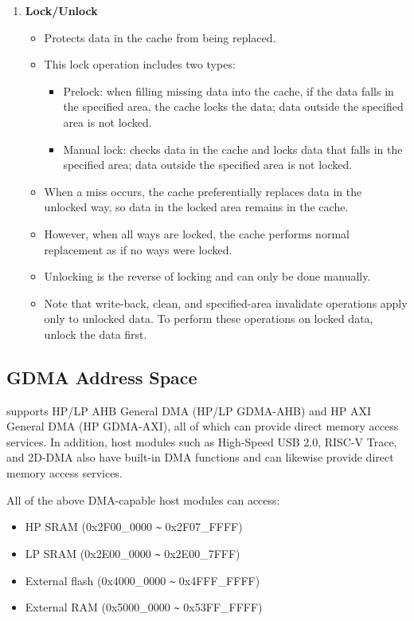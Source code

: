 \documentclass[main\_\_EN.tex]{subfiles}
\begin{document}
\begin{enumerate}
\item \textbf{Lock/Unlock}
\begin{itemize}
    \item Protects data in the cache from being replaced.
    \item This lock operation includes two types:
    \begin{itemize}
    \item Prelock: when filling missing data into the cache, if the data falls in the specified area, the cache locks the data; data outside the specified area is not locked.
    \item Manual lock: checks data in the cache and locks data that falls in the specified area; data outside the specified area is not locked.
    \end{itemize}
    \item When a miss occurs, the cache preferentially replaces data in the unlocked way, so data in the locked area remains in the cache.
    \item However, when all ways are locked, the cache performs normal replacement as if no ways were locked.
    \item Unlocking is the reverse of locking and can only be done manually.
    \item Note that write-back, clean, and specified-area invalidate operations apply only to unlocked data. To perform these operations on locked data, unlock the data first.

\end{itemize}
\end{enumerate}


\subsection{GDMA Address Space}

\chipname{} supports HP/LP AHB General DMA (HP/LP GDMA-AHB) and HP AXI General DMA (HP GDMA-AXI), all of which can provide direct memory access services. In addition, host modules such as High-Speed USB 2.0, RISC-V Trace, and 2D-DMA also have built-in DMA functions and can likewise provide direct memory access services.

All of the above DMA-capable host modules can access:
\begin{itemize}
    \item HP SRAM (0x2F00\_0000 \verb+~+ 0x2F07\_FFFF)
    \item LP SRAM  (0x2E00\_0000 \verb+~+ 0x2E00\_7FFF)
    \item External flash (0x4000\_0000 \verb+~+ 0x4FFF\_FFFF)
    \item External RAM (0x5000\_0000 \verb+~+ 0x53FF\_FFFF)
    \end{itemize}
\end{document}
